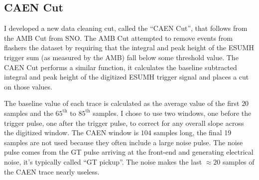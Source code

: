 \begin{appendices}
\section{CAEN Cut}
I developed a new data cleaning cut, called the ``CAEN Cut'', that follows from
the AMB Cut from SNO\@.
The AMB Cut attempted to remove events from flashers the dataset by requiring
that the integral and peak height of the ESUMH trigger sum (as measured by the
AMB) fall below some threshold value.
The CAEN Cut performs a similar function, it calculates the baseline subtracted
integral and peak height of the digitized ESUMH trigger signal and places a cut on those values.

The baseline value of each trace is calculated as the average value of the first
$20$ samples and the $65^{\text{th}}$ to $85^{\text{th}}$ samples.
I chose to use two windows, one before the trigger pulse, one after the trigger pulse, to
correct for any overall slope across the digitized window.
The CAEN window is $104$ samples long, the final 19 samples are not used because they often
include a large noise pulse.
The noise pulse comes from the GT pulse arriving at the front-end and generating electrical noise,
it's typically called ``GT pickup''.
The noise makes the last $\approx20$ samples of the CAEN trace nearly
useless.


\end{appendices}
